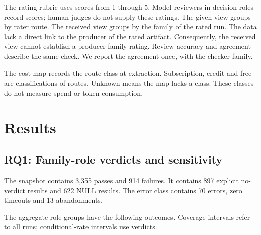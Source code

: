 \documentclass[
  10pt,
  a4paper,
]{article}
\begin{document}
The rating rubric uses scores from 1 through 5. Model reviewers in
decision roles record scores; human judges do not supply these ratings.
The given view groups by rater route. The received view groups by the
family of the rated run. The data lack a direct link to the producer of
the rated artifact. Consequently, the received view cannot establish a
producer-family rating. Review accuracy and agreement describe the same
check. We report the agreement once, with the checker family.

The cost map records the route class at extraction. Subscription, credit
and free are classifications of routes. Unknown means the map lacks a
class. These classes do not measure spend or token consumption.

\section{Results}\label{results}

\subsection{RQ1: Family-role verdicts and
sensitivity}\label{rq1-family-role-verdicts-and-sensitivity}

The snapshot contains 3,355 passes and 914 failures. It contains 897
explicit no-verdict results and 622 NULL results. The error class
contains 70 errors, zero timeouts and 13 abandonments.

The aggregate role groups have the following outcomes. Coverage
intervals refer to all runs; conditional-rate intervals use verdicts.
\end{document}
